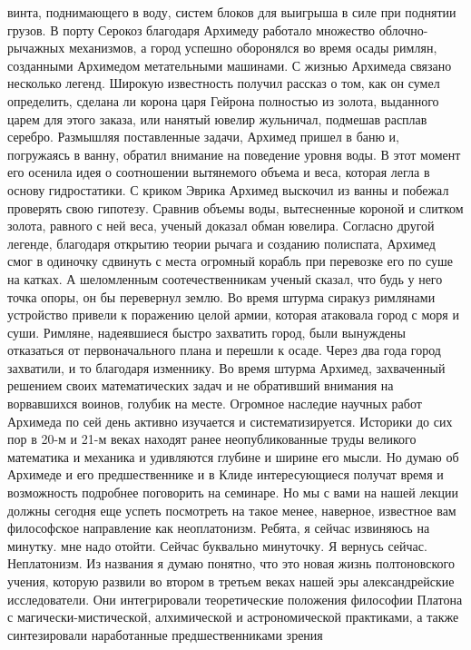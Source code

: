 винта, поднимающего в воду, систем блоков для выигрыша в силе при поднятии
грузов. В порту Серокоз благодаря Архимеду работало множество облочно-рычажных
механизмов, а город успешно оборонялся во время осады римлян, созданными
Архимедом метательными машинами. С жизнью Архимеда связано несколько легенд.
Широкую известность получил рассказ о том, как он сумел определить, сделана ли
корона царя Гейрона полностью из золота, выданного царем для этого заказа, или
нанятый ювелир жульничал, подмешав расплав серебро. Размышляя поставленные
задачи, Архимед пришел в баню и, погружаясь в ванну, обратил внимание на
поведение уровня воды. В этот момент его осенила идея о соотношении вытянемого
объема и веса, которая легла в основу гидростатики. С криком Эврика Архимед
выскочил из ванны и побежал проверять свою гипотезу. Сравнив объемы воды,
вытесненные короной и слитком золота, равного с ней веса, ученый доказал обман
ювелира. Согласно другой легенде, благодаря открытию теории рычага и созданию
полиспата, Архимед смог в одиночку сдвинуть с места огромный корабль при
перевозке его по суше на катках. А шеломленным соотечественникам ученый сказал,
что будь у него точка опоры, он бы перевернул землю. Во время штурма сиракуз
римлянами устройство привели к поражению целой армии, которая атаковала город с
моря и суши. Римляне, надеявшиеся быстро захватить город, были вынуждены
отказаться от первоначального плана и перешли к осаде. Через два года город
захватили, и то благодаря изменнику. Во время штурма Архимед, захваченный
решением своих математических задач и не обративший внимания на ворвавшихся
воинов, голубик на месте. Огромное наследие научных работ Архимеда по сей день
активно изучается и систематизируется. Историки до сих пор в 20-м и 21-м веках
находят ранее неопубликованные труды великого математика и механика и удивляются
глубине и ширине его мысли. Но думаю об Архимеде и его предшественнике и в Клиде
интересующиеся получат время и возможность подробнее поговорить на семинаре. Но
мы с вами на нашей лекции должны сегодня еще успеть посмотреть на такое менее,
наверное, известное вам философское направление как неоплатонизм. Ребята, я
сейчас извиняюсь на минутку. мне надо отойти. Сейчас буквально минуточку. Я
вернусь сейчас. Неплатонизм. Из названия я думаю понятно, что это новая жизнь
полтоновского учения, которую развили во втором в третьем веках нашей эры
александрейские исследователи. Они интегрировали теоретические положения
философии Платона с магически-мистической, алхимической и астрономической
практиками, а также синтезировали наработанные предшественниками зрения
